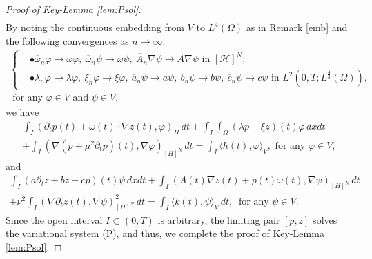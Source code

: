 \documentclass{sinst}
\numberwithin{equation}{section}
\theoremstyle{plain}
\theoremstyle{definition}
\def\sH{\mathscr{H}}
\begin{document}
\begin{proof}[Proof of Key-Lemma \ref{lem:Psol}]
\begin{gather}
  \end{gather}
  By noting the continuous embedding from $V$ to $L^4(\Omega)$ as in Remark \ref{emb} and the following convergences as $n \to \infty$:
  \begin{gather}
    \left\{ \begin{aligned}
      &\bullet \overline{\omega}_n \varphi \to \omega \varphi, \ \overline{\omega}_n \psi \to \omega \psi, \ \overline{A}_n \nabla \psi \to A \nabla \psi \mbox{ in } [\sH]^N,
      \\
      &\bullet \overline{\lambda}_n \varphi \to \lambda \varphi, \ \overline{\xi}_n \varphi \to \xi \varphi, \ \overline{a}_n \psi \to a \psi, \ \overline{b}_n \psi \to b \psi, \ \overline{c}_n \psi \to c \psi \mbox{ in } L^2(0,T;L^\frac{4}{3}(\Omega)),
    \end{aligned} \right.
    \\
    \mbox{ for any } \varphi \in V \mbox{ and } \psi \in V,
  \end{gather}
  we have
  \begin{gather}
    \int_I (\partial_t p(t) + \omega(t) \cdot \nabla z(t), \varphi)_H \,dt + \int_I \int_\Omega (\lambda p + \xi z)(t) \varphi \,dxdt
    \\
    + \int_I (\nabla (p + \mu^2 \partial_t p)(t), \nabla \varphi)_{[H]^N}\,dt = \int_I \langle h(t), \varphi \rangle_V, \mbox{ for any } \varphi \in V,
  \end{gather}
  and
  \begin{gather}
    \int_I (a \partial_t z + b z + c p)(t) \psi \,dxdt + \int_I (A(t) \nabla z(t) + p(t) \omega(t), \nabla \psi)_{[H]^N} \,dt
    \\
    + \nu^2 \int_I (\nabla \partial_t z(t), \nabla \psi)_{[H]^N}^2 \,dt = \int_I \langle k(t), \psi \rangle_V \,dt, \ \mbox{ for any } \psi \in V.
  \end{gather}
  Since the open interval $I \subset (0,T)$ is arbitrary, the limiting pair $[p,z]$ solves the variational system (P), and thus, we complete the proof of Key-Lemma \ref{lem:Psol}.
\end{proof}
\end{document}

